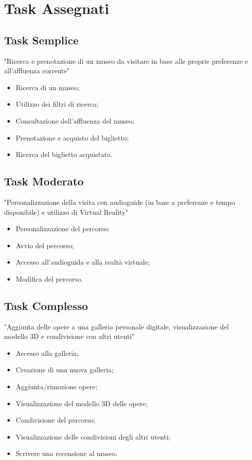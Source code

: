 \documentclass{article}
\begin{document}
\newpage

\section{Task Assegnati}
\subsection*{Task Semplice}
"Ricerca e prenotazione di un museo da visitare in base alle proprie preferenze e all’affluenza corrente"
\begin{itemize}
    \item Ricerca di un museo;
    \item Utilizzo dei filtri di ricerca;
    \item Consultazione dell’affluenza del museo;
    \item Prenotazione e acquisto del biglietto;
    \item Ricerca del biglietto acquistato.
\end{itemize}

\subsection*{Task Moderato}
"Personalizzazione della visita con audioguide (in base a preferenze e tempo disponibile) e utilizzo di Virtual Reality"
\begin{itemize}
    \item Personalizzazione del percorso;
    \item Avvio del percorso;
    \item Accesso all'audioguida e alla realt\`a virtuale;
    \item Modifica del percorso.
\end{itemize}

\subsection*{Task Complesso}
"Aggiunta delle opere a una galleria personale digitale, visualizzazione del modello 3D e condivisione con altri utenti"
\begin{itemize}
    \item Accesso alla galleria;
    \item Creazione di una nuova galleria;
    \item Aggiunta/rimozione opere;
    \item Visualizzazione del modello 3D delle opere;
    \item Condivisione del percorso;
    \item Visualizzazione delle condivisioni degli altri utenti;
    \item Scrivere una recensione al museo.
\end{itemize}
\end{document}
